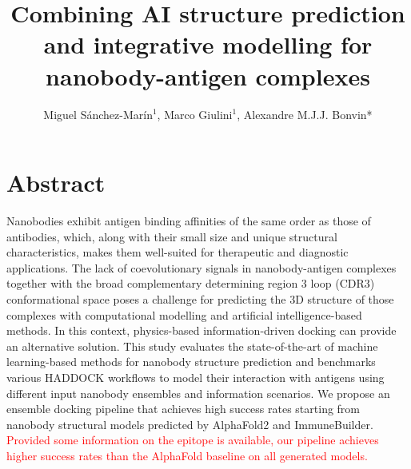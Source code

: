 \documentclass[12pt]{article}
\begin{document}
\title{Combining AI structure prediction and integrative modelling for nanobody-antigen complexes}

\author{Miguel Sánchez-Marín$^{1}$, Marco Giulini$^{1}$, Alexandre M.J.J. Bonvin*}



\date{}

\maketitle
\vspace{-1.6cm}


\section*{Abstract}
Nanobodies exhibit antigen binding affinities of the same order as those of antibodies, which, along with their small size and unique structural characteristics, makes them well-suited for therapeutic and diagnostic applications. The lack of coevolutionary signals in nanobody-antigen complexes together with the broad complementary determining region 3 loop (CDR3) conformational space poses a challenge for predicting the 3D structure of those complexes with computational modelling and artificial intelligence-based methods. In this context, physics-based information-driven docking can provide an alternative solution. This study evaluates the state-of-the-art of machine learning-based methods for nanobody structure prediction and benchmarks various HADDOCK workflows to model their interaction with antigens using different input nanobody ensembles and information scenarios. We propose an ensemble docking pipeline that achieves high success rates starting from nanobody structural models predicted by AlphaFold2 and ImmuneBuilder. \textcolor{Red}{Provided some information on the epitope is available, our pipeline achieves higher success rates than the AlphaFold baseline on all generated models.}
\\
\end{document}
